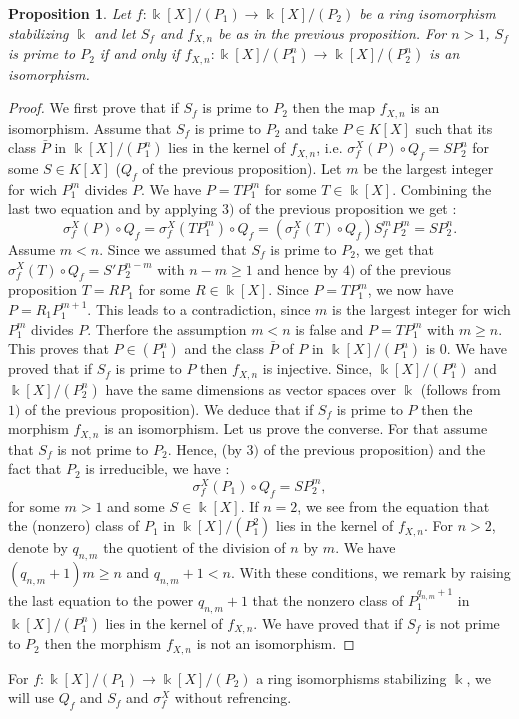 \documentclass[12pt, reqno]{amsart}
\newtheorem{proposition}[theorem]{Proposition}
\newcommand{\K}{ {\Bbbk} }
\newcommand{\KP}{{\Bbbk[X]/(P_1)}}
\newcommand{\KPP}{{\Bbbk[X]/(P_2)}}
\newcommand{\KPn}{{\Bbbk[X]/(P_1^n)}}
\newcommand{\KPPn}{{\Bbbk[X]/(P_2^n)}}
\begin{document}
\begin{proposition}\label{12}
Let $f: \KP\to \KPP$ be a ring isomorphism stabilizing $\K$ and let $S_f$ and $f_{X,n}$ be as in the previous proposition. For $n>1$, $S_f$ is prime to $P_2$ if and only if  $f_{X,n}:\KPn\to \KPPn$ is an isomorphism.
\end{proposition}
\begin{proof}
We first prove that if $S_f$ is prime to $P_2$ then the map $f_{X,n}$ is an isomorphism.
Assume that $S_f$ is prime to $P_2$ and take $P\in K[X]$ such that its class $\bar{P}$ in $\KPn$ lies in the kernel of $f_{X,n}$, i.e. $\sigma_f^X(P)\circ Q_f=SP_2^n$ for some $S\in K[X]$ ($Q_f$ of the previous proposition). Let $m$ be the largest integer for wich $P_1^m$ divides $P$. We have $P=TP_1^m$ for some $T\in \K[X]$. Combining the last two equation and by applying $3)$ of the previous proposition we get :
$$ \sigma_f^X(P)\circ Q_f=\sigma_f^X(TP_1^m)\circ Q_f=(\sigma_f^X(T)\circ Q_f)S_f^mP_2^m=SP_2^n.$$ 
Assume $m <n$. Since we assumed that $S_f$ is prime to $P_2$, we get that $ \sigma_f^X(T)\circ Q_f=S'P_2^{n-m}$ with $n-m\geq 1$ and hence by $4)$ of the previous proposition $T=RP_1$ for some $R\in \K[X]$. Since $P=TP_1^m$, we now have $P=R_1P_1^{m+1}$. This leads to a contradiction, since $m$ is the largest integer for wich $P_1^m$ divides $P$. Therfore the assumption $m<n$ is false and $P=TP_1^m$ with $m\geq n$. This proves that $P \in (P_1^n)$ and the class $\bar{P}$ of $P$ in $\KPn$ is $0$. We have proved that if $S_f$ is prime to $P$ then $f_{X,n}$ is injective. Since, $\KPn$ and $\KPPn$ have the same dimensions as vector spaces over $\K$ (follows from $1)$ of the previous proposition). We deduce that if $S_f$ is prime to $P$ then the morphism $f_{X,n}$ is an isomorphism. Let us prove the converse. For that assume that $S_f$ is not prime to $P_2$. Hence, (by $3)$ of the previous proposition) and the fact that $P_2$ is irreducible, we have : $$\sigma_f^X( P_1) \circ Q_f= S P_2^m,$$ for some $m>1$ and some $S \in \K[X]$. If $n=2$, we see from the equation that the (nonzero) class of $P_1$ in $\K[X]/(P_1^2)$ lies in the kernel of $f_{X,n}$. For $n>2$, denote by $q_{n,m}$ the quotient of the division of $n$ by $m$. We have $(q_{n,m}+1) m \geq n$ and $q_{n,m}+1<n$. With these conditions, we remark by raising the last equation to the power $q_{n,m}+1$ that the nonzero class of $P_1^{q_{n,m}+1}$ in $\KPn$ lies in the kernel of $f_{X,n}$. We have proved that if $S_f$ is not prime to $P_2$ then the morphism $f_{X,n}$ is not an isomorphism.
\end{proof}
For $f: \KP\to \KPP$ a ring isomorphisms stabilizing $\K$, we will use $Q_f$ and $S_f$ and $\sigma_f^X$ without refrencing.
\end{document}
